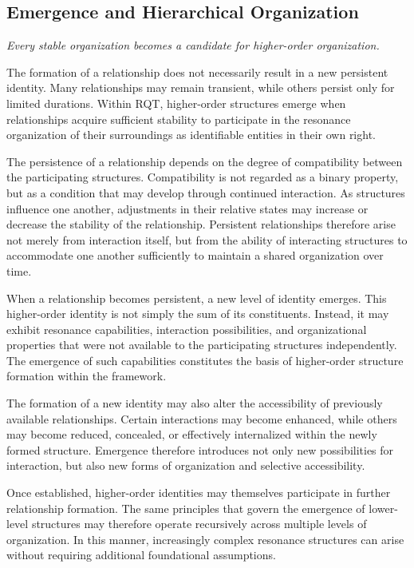 \documentclass[11pt,a4paper]{article}
\begin{document}
\subsection{Emergence and Hierarchical Organization}

\emph{Every stable organization becomes a candidate for higher-order organization.}

The formation of a relationship does not necessarily result in a new persistent identity. Many relationships may remain transient, while others persist only for limited durations. Within RQT, higher-order structures emerge when relationships acquire sufficient stability to participate in the resonance organization of their surroundings as identifiable entities in their own right.

The persistence of a relationship depends on the degree of compatibility between the participating structures. Compatibility is not regarded as a binary property, but as a condition that may develop through continued interaction. As structures influence one another, adjustments in their relative states may increase or decrease the stability of the relationship. Persistent relationships therefore arise not merely from interaction itself, but from the ability of interacting structures to accommodate one another sufficiently to maintain a shared organization over time.

When a relationship becomes persistent, a new level of identity emerges. This higher-order identity is not simply the sum of its constituents. Instead, it may exhibit resonance capabilities, interaction possibilities, and organizational properties that were not available to the participating structures independently. The emergence of such capabilities constitutes the basis of higher-order structure formation within the framework.

The formation of a new identity may also alter the accessibility of previously available relationships. Certain interactions may become enhanced, while others may become reduced, concealed, or effectively internalized within the newly formed structure. Emergence therefore introduces not only new possibilities for interaction, but also new forms of organization and selective accessibility.

Once established, higher-order identities may themselves participate in further relationship formation. The same principles that govern the emergence of lower-level structures may therefore operate recursively across multiple levels of organization. In this manner, increasingly complex resonance structures can arise without requiring additional foundational assumptions.
\end{document}
